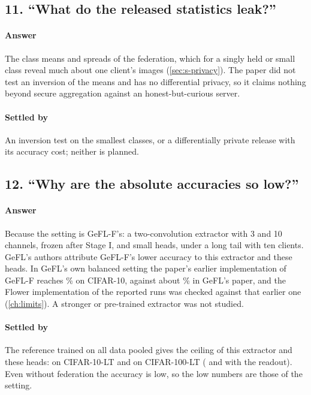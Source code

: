 \subsection*{11. ``What do the released statistics leak?''}

\paragraph{Answer} The class means and spreads of the federation, which for a singly held or small class reveal much
about one client's images (\cref{sec:s-privacy}). The paper did not test an inversion of the means and has no
differential privacy, so it claims nothing beyond secure aggregation against an honest-but-curious server.

\paragraph{Settled by} An inversion test on the smallest classes, or a differentially private release with its
accuracy cost; neither is planned.

\subsection*{12. ``Why are the absolute accuracies so low?''}

\paragraph{Answer} Because the setting is GeFL-F's: a two-convolution extractor with 3 and 10 channels, frozen after
Stage I, and small heads, under a long tail with ten clients. GeFL's authors attribute GeFL-F's lower accuracy to
this extractor and these heads. In GeFL's own balanced setting the paper's earlier implementation of GeFL-F reaches
\% on CIFAR-10, against about \% in GeFL's paper, and the
Flower implementation of the reported runs was checked against that earlier one (\cref{ch:limits}). A stronger or
pre-trained extractor was not studied.

\paragraph{Settled by} The reference trained on all data pooled gives the ceiling of this extractor and these heads:
 on CIFAR-10-LT and  on
CIFAR-100-LT ( and 
with the readout). Even without federation the accuracy is low, so the low numbers are those of the setting.

